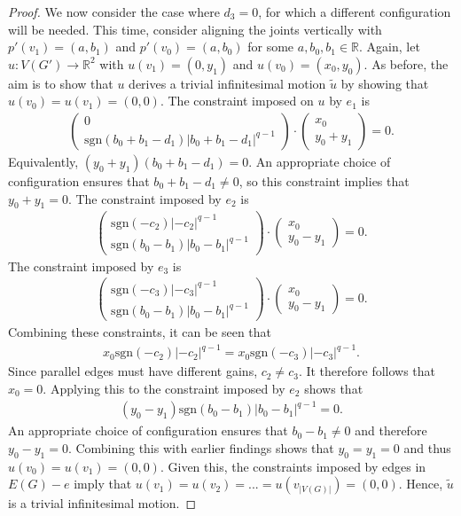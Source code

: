 \documentclass[reqno,a4paper,10pt]{article}
\theoremstyle{definition}
\theoremstyle{remark}
\numberwithin{equation}{section}
\numberwithin{figure}{section}
\numberwithin{table}{section}
\newcommand{\R}{\mathbb{R}}
\begin{document}
\begin{proof}
        We now consider the case where $d_3=0$, for which a different configuration will be needed. This time, consider aligning the joints vertically with $p'(v_1)=(a,b_1)$ and $p'(v_0)=(a,b_0)$ for some $a,b_0,b_1\in\R$. Again, let $u:V(G')\to\R^2$ with $u(v_1)=(0,y_1)$ and $u(v_0)=(x_0,y_0)$. As before, the aim is to show that $u$ derives a trivial infinitesimal motion $\tilde{u}$ by showing that $u(v_0)=u(v_1)=(0,0)$. The constraint imposed on $u$ by $e_1$ is
		\begin{align*}
			\begin{pmatrix}
				0\\
				\mathrm{sgn}(b_0+b_1-d_1)|b_0+b_1-d_1|^{q-1}
			\end{pmatrix}
			\cdot
			\begin{pmatrix}
				x_0\\
				y_0+y_1
			\end{pmatrix}
			=0.
		\end{align*}
		Equivalently, $(y_0+y_1)(b_0+b_1-d_1)=0$. An appropriate choice of configuration ensures that $b_0+b_1-d_1\neq0$, so this constraint implies that $y_0+y_1=0$. The constraint imposed by $e_2$ is 
		\begin{align*}
			\begin{pmatrix}
				\mathrm{sgn}(-c_2)|-c_2|^{q-1}\\
				\mathrm{sgn}(b_0-b_1)|b_0-b_1|^{q-1}
			\end{pmatrix}
			\cdot
			\begin{pmatrix}
				x_0\\
				y_0-y_1
			\end{pmatrix}
			=0.
		\end{align*}
		The constraint imposed by $e_3$ is
		\begin{align*}
			\begin{pmatrix}
				\mathrm{sgn}(-c_3)|-c_3|^{q-1}\\
				\mathrm{sgn}(b_0-b_1)|b_0-b_1|^{q-1}
			\end{pmatrix}
			\cdot
			\begin{pmatrix}
				x_0\\
				y_0-y_1
			\end{pmatrix}
			=0.
		\end{align*}
		Combining these constraints, it can be seen that
        \begin{align*}
            x_0\mathrm{sgn}(-c_2)|-c_2|^{q-1}=x_0\mathrm{sgn}(-c_3)|-c_3|^{q-1}.
        \end{align*}
        Since parallel edges must have different gains, $c_2\neq c_3$. It therefore follows that $x_0=0$. Applying this to the constraint imposed by $e_2$ shows that
        \begin{align*}
            (y_0-y_1)\mathrm{sgn}(b_0-b_1)|b_0-b_1|^{q-1}=0.
        \end{align*}
        An appropriate choice of configuration ensures that $b_0-b_1\neq0$ and therefore $y_0-y_1=0$. Combining this with earlier findings shows that $y_0=y_1=0$ and thus $u(v_0)=u(v_1)=(0,0)$. Given this, the constraints imposed by edges in $E(G)-e$ imply that $u(v_1)=u(v_2)=...=u(v_{|V(G)|})=(0,0)$. Hence, $\tilde{u}$ is a trivial infinitesimal motion.
    \end{proof}
\end{document}
